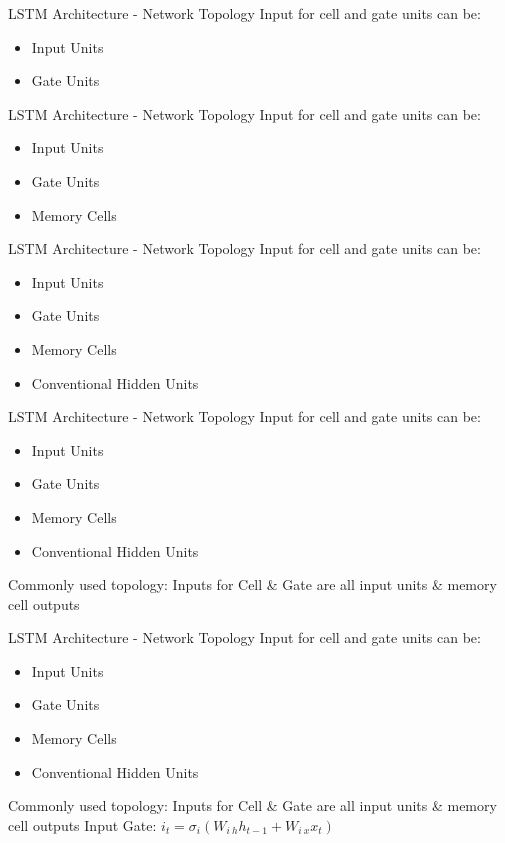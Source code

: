 \documentclass[10pt, aspectratio=169]{beamer}
\begin{document}
\begin{frame}[t]{LSTM Architecture - Network Topology}
Input for cell and gate units can be:
\begin{itemize}
    \item Input Units
    \item Gate Units
\end{itemize}
\end{frame}

\begin{frame}[t]{LSTM Architecture - Network Topology}
Input for cell and gate units can be:
\begin{itemize}
    \item Input Units
    \item Gate Units
    \item Memory Cells
\end{itemize}
\end{frame}

\begin{frame}[t]{LSTM Architecture - Network Topology}
Input for cell and gate units can be:
\begin{itemize}
    \item Input Units
    \item Gate Units
    \item Memory Cells
    \item Conventional Hidden Units
\end{itemize}
\end{frame}

\begin{frame}[t]{LSTM Architecture - Network Topology}
Input for cell and gate units can be:
\begin{itemize}
    \item Input Units
    \item Gate Units
    \item Memory Cells
    \item Conventional Hidden Units
\end{itemize}
Commonly used topology: Inputs for Cell \& Gate are all input units \& memory cell outputs
\end{frame}

\begin{frame}[t]{LSTM Architecture - Network Topology}
Input for cell and gate units can be:
\begin{itemize}
    \item Input Units
    \item Gate Units
    \item Memory Cells
    \item Conventional Hidden Units
\end{itemize}
Commonly used topology: Inputs for Cell \& Gate are all input units \& memory cell outputs
Input Gate: \begin{math}i_t=\sigma_i\left(W_{i\ h}h_{t-1}+W_{i\ x} x_t\right)\end{math}
\end{frame}
\end{document}
